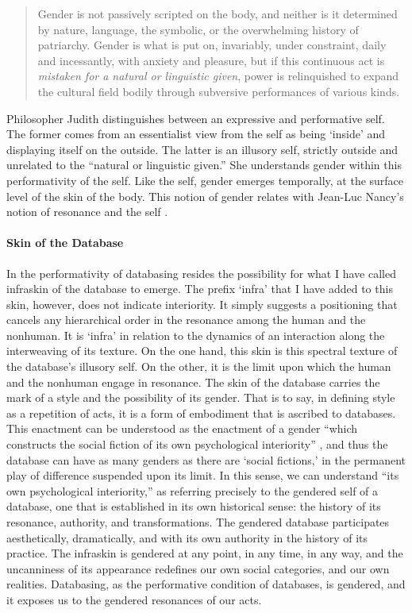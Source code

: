 \begin{quote}
	Gender is not passively scripted on the body, and neither is it determined by nature, language, the symbolic, or the overwhelming history of patriarchy. Gender is what is put on, invariably, under constraint, daily and incessantly, with anxiety and pleasure, but if this continuous act is \textit{mistaken for a natural or linguistic given}, power is relinquished to expand the cultural field bodily through subversive performances of various kinds. \parencite[531]{But88:Per}
\end{quote}

Philosopher Judith \textcite{But88:Per} distinguishes between an expressive and performative self. The former comes from an essentialist view from the self as being `inside' and displaying itself on the outside. The latter is an illusory self, strictly outside and unrelated to the ``natural or linguistic given.'' She understands gender within this performativity of the self. Like the self, gender emerges temporally, at the surface level of the skin of the body. This notion of gender relates with Jean-Luc Nancy's notion of resonance and the self .

\paragraph{Skin of the Database}
In the performativity of databasing resides the possibility for what I have called infraskin of the database to emerge. The prefix `infra' that I have added to this skin, however, does not indicate interiority. It simply suggests a positioning that cancels any hierarchical order in the resonance among the human and the nonhuman. It is `infra' in relation to the dynamics of an interaction along the interweaving of its texture. On the one hand, this skin is this spectral texture of the database's illusory self. On the other, it is the limit upon which the human and the nonhuman engage in resonance. The skin of the database carries the mark of a style and the possibility of its gender. That is to say, in defining style as a repetition of acts, it is a form of embodiment that is ascribed to databases. This enactment can be understood as the enactment of a gender ``which constructs the social fiction of its own psychological interiority'' \parencite[528]{But88:Per}, and thus the database can have as many genders as there are `social fictions,' in the permanent play of difference suspended upon its limit. In this sense, we can understand ``its own psychological interiority,'' as referring precisely to the gendered self of a database, one that is established in its own historical sense: the history of its resonance, authority, and transformations. The gendered database participates aesthetically, dramatically, and with its own authority in the history of its practice. The infraskin is gendered at any point, in any time, in any way, and the uncanniness of its appearance redefines our own social categories, and our own realities. Databasing, as the performative condition of databases, is gendered, and it exposes us to the gendered resonances of our acts.

